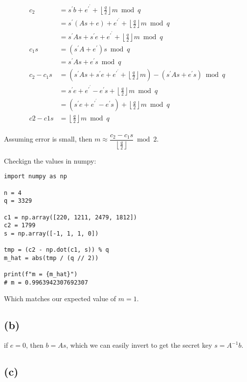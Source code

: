 \documentclass[11pt]{article}
\begin{document}
\begin{align*}
  c_2 &= s^\prime b + e^\prime^\prime + \left\lfloor\frac{q}{2}\right\rfloor m \bmod q \\
  &= s^\prime (As + e) + e^\prime^\prime + \left\lfloor\frac{q}{2}\right\rfloor m \bmod q \\
  &= s^\prime As + s^\prime e + e^\prime^\prime + \left\lfloor\frac{q}{2}\right\rfloor m \bmod q \\
  c_1 s &= (s^\prime A + e^\prime)s \bmod q \\
  &= s^\prime As + e^\prime s \bmod q \\
  c_2 - c_1 s &= (s^\prime As + s^\prime e + e^\prime^\prime + \left\lfloor\frac{q}{2}\right\rfloor m) - (s^\prime As + e^\prime s) \bmod q \\
  &= s^\prime e + e^\prime^\prime - e^\prime s + \left\lfloor\frac{q}{2}\right\rfloor m \bmod q \\
  &= (s^\prime e + e^\prime^\prime - e^\prime s) + \left\lfloor\frac{q}{2}\right\rfloor m \bmod q \\
  c2 - c1s &= \left\lfloor\frac{q}{2}\right\rfloor m \bmod q \\
\end{align*}

Assuming error is small, then $m \approx \dfrac{c_2 - c_1 s}{\left\lfloor\frac{q}{2}\right\rfloor} \bmod 2$.

Checkign the values in numpy:

\begin{verbatim}
import numpy as np

n = 4
q = 3329

c1 = np.array([220, 1211, 2479, 1812])
c2 = 1799
s = np.array([-1, 1, 1, 0])

tmp = (c2 - np.dot(c1, s)) % q
m_hat = abs(tmp / (q // 2))

print(f"m = {m_hat}")
# m = 0.9963942307692307
\end{verbatim}

Which matches our expected value of $m = 1$.

\subsection{(b)}

if $e = 0$, then $b = As$, which we can easily invert to get the secret key $s = A^{-1}b$.

\subsection{(c)}
\end{document}
